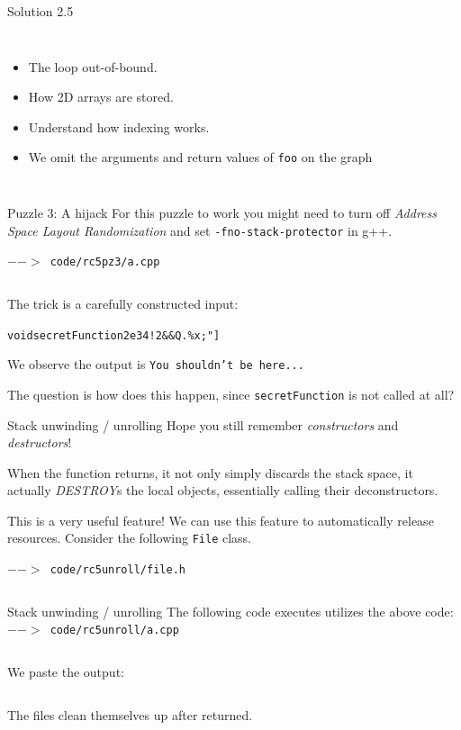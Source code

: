 \begin{frame}{Solution 2.5}
\begin{columns}
	\begin{itemize}
		\item The loop out-of-bound.
		\item How 2D arrays are stored.
		\item Understand how indexing works.
		\item We omit the arguments and return values of \texttt{foo} on the graph
	\end{itemize}
\end{columns}
\end{frame}

\begin{frame}[fragile]{Puzzle 3: A hijack}
For this puzzle to work you might need to turn off \textit{Address Space Layout Randomization} and set \texttt{-fno-stack-protector} in g++.

\texttt{$-->$ code/rc5pz3/a.cpp}
\inputminted{c++}{code/rc5pz3/a.cpp}

The trick is a carefully constructed input:
\begin{center}
 \texttt{voidsecretFunction2e34!2\&\&Q.\%x;"]}
\end{center}
We observe the output is \texttt{You shouldn't be here...}

The question is how does this happen, since \texttt{secretFunction} is not called at all?
\end{frame}

\begin{frame}[fragile]{Stack unwinding / unrolling}
Hope you still remember \textit{constructors} and \textit{destructors}!

When the function returns, it not only simply discards the stack space, it actually \textit{DESTROY}s the local objects, essentially calling their deconstructors. 

This is a very useful feature! We can use this feature to automatically release resources. Consider the following \texttt{File} class.

\texttt{$-->$ code/rc5unroll/file.h}
\inputminted{c++}{code/rc5unroll/file.h}
\end{frame}

\begin{frame}[fragile]{Stack unwinding / unrolling}
The following code executes utilizes the above code:
\texttt{$-->$ code/rc5unroll/a.cpp}
\inputminted{c++}{code/rc5unroll/a.cpp}
We paste the output:
\inputminted{text}{code/rc5unroll/out}
The files clean themselves up after returned. 
\end{frame}

